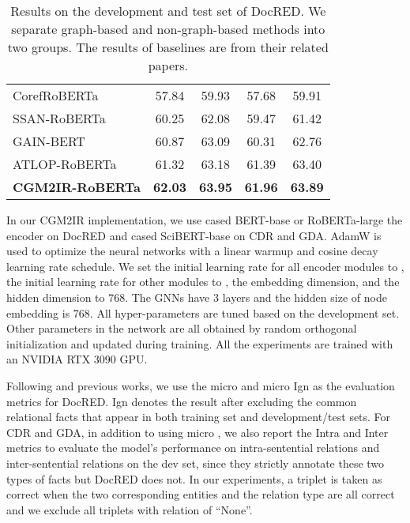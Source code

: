 \documentclass[11pt]{article}
\begin{document}
\begin{table*}[h]
\begin{tabular}{lcccc}
		CorefRoBERTa \citep{ye-etal-2020-coreferential} & 57.84 & 59.93 &  57.68 & 59.91  \\ 
		SSAN-RoBERTa \citep{DBLP:conf/aaai/XuWLZM21} & 60.25 &  62.08  & 59.47 & 61.42  \\ 
		GAIN-BERT \citep{zeng-etal-2020-double} & 60.87 & 63.09  &  60.31  &  62.76  \\ 
		ATLOP-RoBERTa \citep{DBLP:conf/aaai/Zhou0M021} & 61.32 &  63.18 &  61.39 & 63.40  \\ \hdashline
		\textbf{CGM2IR-RoBERTa}  & \textbf{62.03}     & \textbf{63.95}  & \textbf{61.96}  & \textbf{63.89}  \\ \hline \bottomrule

	\end{tabular}
	\caption{Results on the development and test set of DocRED. We separate graph-based and non-graph-based methods into two groups. The results of baselines are from their related papers.}
	\label{tab:result_docred}
\end{table*}
In our CGM2IR implementation, we use cased BERT-base \citep{devlin-etal-2019-bert} or RoBERTa-large \citep{DBLP:journals/corr/abs-1907-11692} the encoder on DocRED and cased SciBERT-base \citep{beltagy-etal-2019-scibert} on CDR and GDA. 
AdamW \citep{DBLP:conf/iclr/LoshchilovH19} is used to optimize the neural networks with a linear warmup and cosine decay learning rate schedule.
We set the initial learning rate for all encoder modules to , the initial learning rate for other modules to , the embedding dimension, and the hidden dimension to 768.
The GNNs have 3 layers and the hidden size of node embedding is 768. 
All hyper-parameters are tuned based on the development set.
Other parameters in the network are all obtained by random orthogonal initialization \citep{DBLP:journals/corr/SaxeMG13} and updated during training.
All the experiments are trained with an NVIDIA RTX 3090 GPU.

Following \citet{yao-etal-2019-docred} and previous works, we use the micro  and micro Ign  as the evaluation metrics for DocRED. 
Ign   denotes the result after excluding the common relational facts that appear in both training set and development/test sets.
For CDR and GDA, in addition to using micro , we also report the  Intra  and Inter  metrics to evaluate the model's performance on intra-sentential relations and inter-sentential relations on the dev set, since they strictly annotate these two types of facts but DocRED does not.
In our experiments, a triplet is taken as correct when the two corresponding entities and the relation type are all correct and we exclude all triplets with relation of ``None''.
\end{document}
